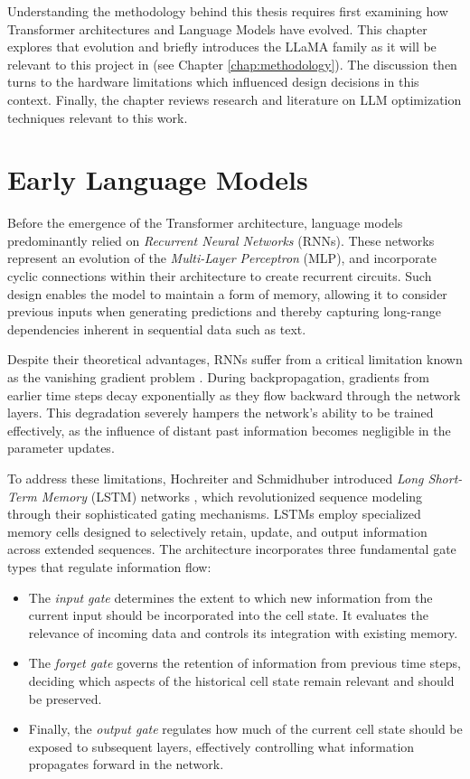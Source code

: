 Understanding the methodology behind this thesis requires first examining how Transformer architectures and Language Models have evolved. This chapter explores that evolution and briefly introduces the LLaMA family as it will be relevant to this project in (see Chapter \ref{chap:methodology}). The discussion then turns to the hardware limitations which influenced design decisions in this context. Finally, the chapter reviews research and literature on LLM optimization techniques relevant to this work.

\section{Early Language Models}
Before the emergence of the Transformer architecture, language models predominantly relied on \textit{Recurrent Neural Networks} (RNNs). These networks represent an evolution of the \textit{Multi-Layer Perceptron} (MLP), and incorporate cyclic connections within their architecture to create recurrent circuits. Such design enables the model to maintain a form of memory, allowing it to consider previous inputs when generating predictions and thereby capturing long-range dependencies inherent in sequential data such as text.

Despite their theoretical advantages, RNNs suffer from a critical limitation known as the vanishing gradient problem \cite{rnn}. During backpropagation, gradients from earlier time steps decay exponentially as they flow backward through the network layers. This degradation severely hampers the network's ability to be trained effectively, as the influence of distant past information becomes negligible in the parameter updates.

To address these limitations, Hochreiter and Schmidhuber introduced \textit{Long Short-Term Memory} (LSTM) networks \cite{lstm} \cite{hinton-lstm}, which revolutionized sequence modeling through their sophisticated gating mechanisms. LSTMs employ specialized memory cells designed to selectively retain, update, and output information across extended sequences.  The architecture incorporates three fundamental gate types that regulate information flow:
\begin{itemize}
    \item The \textit{input gate} determines the extent to which new information from the current input should be incorporated into the cell state. It evaluates the relevance of incoming data and controls its integration with existing memory.
    \item The \textit{forget gate} governs the retention of information from previous time steps, deciding which aspects of the historical cell state remain relevant and should be preserved.
    \item Finally, the \textit{output gate} regulates how much of the current cell state should be exposed to subsequent layers, effectively controlling what information propagates forward in the network.
\end{itemize}

